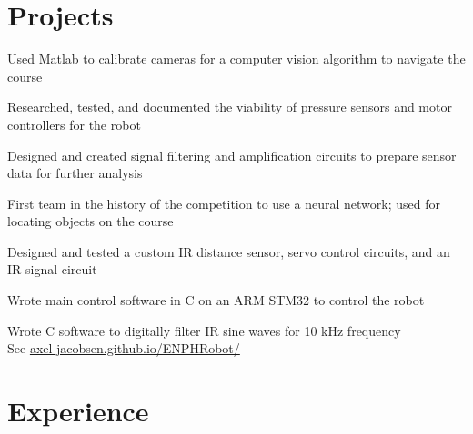 \documentclass[]{deedy-resume-openfont}
\begin{document}

\section{Projects}
\begin{tightemize}
	\item Used Matlab to calibrate cameras for a computer vision algorithm to navigate the course
	\item Researched, tested, and documented the viability of pressure sensors and motor controllers for the robot
	\item Designed and created signal filtering and amplification circuits to prepare sensor data for further analysis
\end{tightemize}
\vspace{8pt}

\begin{tightemize}
	\item First team in the history of the competition to use a neural network; used for locating objects on the course
	\item Designed and tested a custom IR distance sensor, servo control circuits, and an IR signal circuit
	\item Wrote main control software in C on an ARM STM32 to control the robot
	\item Wrote C software to digitally filter IR sine waves for 10 kHz frequency \\
	See \href{https://axel-jacobsen.github.io/ENPHRobot/}{axel-jacobsen.github.io/ENPHRobot/}
\end{tightemize}
\vspace{10pt}

\section{Experience}
\end{document}
